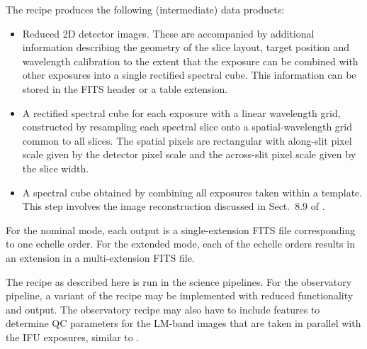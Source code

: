 The recipe produces the following (intermediate) data products:
\begin{itemize}\item Reduced 2D detector images. These are accompanied by additional
  information describing the geometry of the slice layout, target
  position and wavelength calibration to the extent that the exposure can be
  combined with other exposures into a single rectified spectral cube.
  This information can be stored in the FITS header or a table
  extension.
\item A rectified spectral cube for each exposure with a linear
  wavelength grid, constructed by resampling each spectral slice onto
  a spatial-wavelength grid common to all slices. The spatial pixels
  are rectangular with along-slit pixel scale given by the detector
  pixel scale and the across-slit pixel scale given by the slice
  width.
\item A spectral cube obtained by combining all exposures taken within
  a template. This step involves the image reconstruction discussed in
  Sect.~8.9 of \cite{DRLS}.
\end{itemize}

For the nominal mode, each output is a single-extension FITS file
corresponding to one echelle order. For the extended mode, each of the
echelle orders results in an extension in a multi-extension FITS
file.

The recipe as described here is run in the science pipelines. For the
observatory pipeline, a variant of the recipe may be implemented with
reduced functionality and output. The observatory recipe may also have
to include features to determine QC parameters for the LM-band images
that are taken in parallel with the IFU exposures, similar to
 \hyperref[rec:metis_lm_img_basic_reduce]{}.

